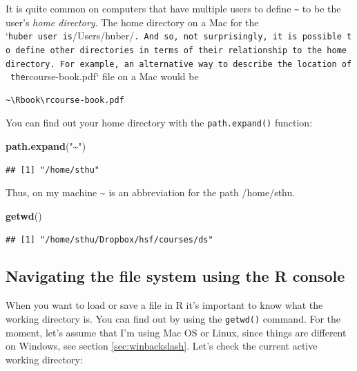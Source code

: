 \documentclass[
  12pt,
  oneside]{book}
\newenvironment{Shaded}{\begin{snugshade}}{\end{snugshade}}
\newcommand{\FunctionTok}[1]{\textcolor[rgb]{0.13,0.29,0.53}{\textbf{#1}}}
\newcommand{\NormalTok}[1]{#1}
\newcommand{\StringTok}[1]{\textcolor[rgb]{0.31,0.60,0.02}{#1}}
\theoremstyle{definition}
\theoremstyle{definition}
\theoremstyle{definition}
\theoremstyle{definition}
\theoremstyle{remark}
\begin{document}
It is quite common on computers that have multiple users to define \texttt{\textasciitilde{}} to be the user's \emph{home directory}. The home directory on a Mac for the `\texttt{huber\textquotesingle{}\textquotesingle{}\ user\ is}/Users/huber/\texttt{.\ And\ so,\ not\ surprisingly,\ it\ is\ possible\ to\ define\ other\ directories\ in\ terms\ of\ their\ relationship\ to\ the\ home\ directory.\ For\ example,\ an\ alternative\ way\ to\ describe\ the\ location\ of\ the}rcourse-book.pdf` file on a Mac would be

\begin{verbatim}
~\Rbook\rcourse-book.pdf
\end{verbatim}

You can find out your home directory with the \texttt{path.expand()} function:

\begin{Shaded}
\begin{Highlighting}[]
\FunctionTok{path.expand}\NormalTok{(}\StringTok{"\textasciitilde{}"}\NormalTok{)}
\end{Highlighting}
\end{Shaded}

\begin{verbatim}
## [1] "/home/sthu"
\end{verbatim}

Thus, on my machine \textasciitilde{} is an abbreviation for the path /home/sthu.

\begin{Shaded}
\begin{Highlighting}[]
\FunctionTok{getwd}\NormalTok{()}
\end{Highlighting}
\end{Shaded}

\begin{verbatim}
## [1] "/home/sthu/Dropbox/hsf/courses/ds"
\end{verbatim}

\hypertarget{sec:navigationR}{%
\subsection{Navigating the file system using the R console}\label{sec:navigationR}}

When you want to load or save a file in R it's important to know what the working directory is. You can find out by using the \texttt{getwd()} command. For the moment, let's assume that I'm using Mac OS or Linux, since things are different on Windows, see section \ref{sec:winbackslash}.
Let's check the current active working directory:
\end{document}

